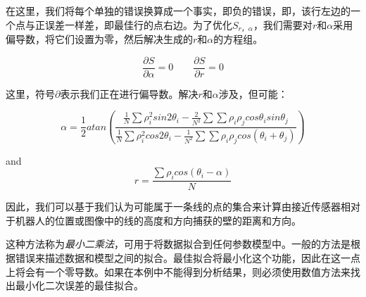 在这里，我们将每个单独的错误换算成一个事实，即负的错误，即，该行左边的一个点与正误差一样差，即最佳行的点右边。为了优化$S_{r，\alpha}$，我们需要对$r$和$\alpha$采用偏导数，将它们设置为零，然后解决生成的$r$和$\alpha$的方程组。


\begin{equation}
\frac{\partial{S}}{\partial{\alpha}}=0 \qquad \frac{\partial{S}}{\partial{r}}=0
\end{equation}


这里，符号$\partial$表示我们正在进行偏导数。解决$r$和$\alpha$涉及，但可能\cite{siegwart2011introduction}：

\begin{equation}\label{eq:linealpha}
\alpha=\frac{1}{2}atan\left(\frac{\frac{1}{N}\sum{\rho_i^2 sin 2\theta_i}-\frac{2}{N^2}\sum{\sum{\rho_i\rho_j cos \theta_i sin \theta_j}}}{\frac{1}{N}\sum{\rho_i^2 cos 2 \theta_i - \frac{1}{N^2}\sum{\sum{\rho_i \rho_j cos(\theta_i+\theta_j)}}}}\right)
\end{equation}

and
\begin{equation}\label{eq:liner}
r=\frac{{\sum \rho_i cos (\theta_i-\alpha)}}{N}
\end{equation}




因此，我们可以基于我们认为可能属于一条线的点的集合来计算由接近传感器相对于机器人的位置或图像中的线的高度和方向捕获的壁的距离和方向。

这种方法称为\emph{最小二乘法}，可用于将数据拟合到任何参数模型中。一般的方法是根据错误来描述数据和模型之间的拟合。最佳拟合将最小化这个功能，因此在这一点上将会有一个零导数。如果在本例中不能得到分析结果，则必须使用数值方法来找出最小化二次误差的最佳拟合。


